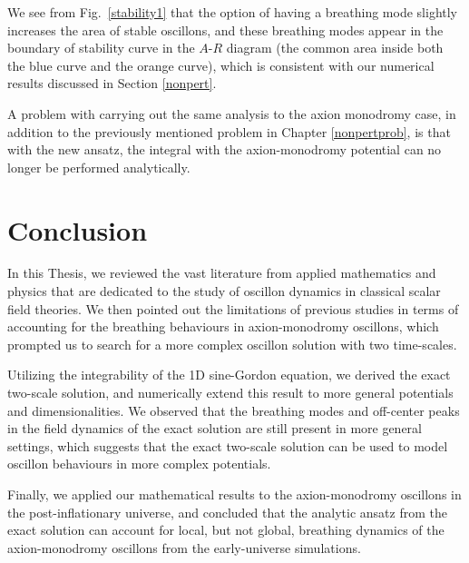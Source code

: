 \documentclass{report}
\begin{document}
We see from Fig.~\ref{stability1} that the option of having a breathing mode slightly increases the area of stable oscillons, and these breathing modes appear in the boundary of stability curve in the $A$-$R$ diagram (the common area inside both the blue curve and the orange curve), which is consistent with our numerical results discussed in Section \ref{nonpert}.

A problem with carrying out the same analysis to the axion monodromy case, in addition to the previously mentioned problem in Chapter \ref{nonpertprob}, is that with the new ansatz, the integral with the axion-monodromy potential can no longer be performed analytically.

\chapter{Conclusion}

In this Thesis, we reviewed the vast literature from applied mathematics and physics that are dedicated to the study of oscillon dynamics in classical scalar field theories. We then pointed out the limitations of previous studies in terms of accounting for the breathing behaviours in axion-monodromy oscillons, which prompted us to search for a more complex oscillon solution with two time-scales.

Utilizing the integrability of the 1D sine-Gordon equation, we derived the exact two-scale solution, and numerically extend this result to more general potentials and dimensionalities. We observed that the breathing modes and off-center peaks in the field dynamics of the exact solution are still present in more general settings, which suggests that the exact two-scale solution can be used to model oscillon behaviours in more complex potentials.

Finally, we applied our mathematical results to the axion-monodromy oscillons in the post-inflationary universe, and concluded that the analytic ansatz from the exact solution can account for local, but not global, breathing dynamics of the axion-monodromy oscillons from the early-universe simulations.



\end{document}
